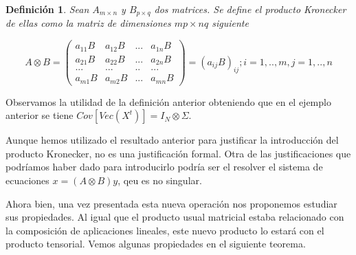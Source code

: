 \documentclass{article}
\theoremstyle{theorem-style}  %
\theoremstyle{definition}
\newtheorem{definition}{Definición}[section]
\theoremstyle{example-style}
\begin{document}
	\begin{definition}
		\textit{Sean $A_{m \times n}$ y $B_{p \times q}$ dos matrices. Se define el producto Kronecker de ellas como la matriz de dimensiones $mp \times nq$ siguiente}
		
		$$A \otimes B =  \left( {\begin{array}{cccc}
			a_{11}B & a_{12}B & ... & a_{1n}B\\
			a_{21}B & a_{22}B & ... & a_{2n}B\\
			... & ... & .. & ... \\
			a_{m1}B & a_{m2}B  & ... & a_{mn}B
			\end{array}}\right) = (a_{ij}B)_{ij} ; i = 1,.., m, j = 1,.., n$$
		
	\end{definition}
	
	Observamos la utilidad de la definición anterior obteniendo que en el ejemplo anterior se tiene $Cov[Vec(X^t)] = I_N \otimes \Sigma$.
	
	Aunque hemos utilizado el resultado anterior para justificar la introducción del producto Kronecker, no es una justificación formal. Otra de las justificaciones que podríamos haber dado para introducirlo podría ser  el resolver el sistema de ecuaciones $x = (A \otimes B)y$, qeu es no singular. 
	
	Ahora bien, una vez presentada esta nueva operación nos proponemos estudiar sus propiedades. Al igual que el producto usual matricial estaba relacionado con la composición de aplicaciones lineales, este nuevo producto lo estará con el producto tensorial. Vemos algunas propiedades en el siguiente teorema.
	
\end{document}
